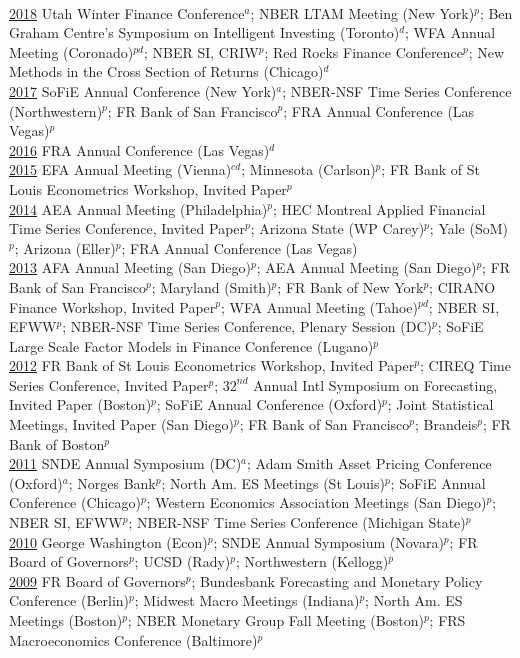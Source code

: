 \documentclass[margin,line,12pt]{res}
\begin{document}
\begin{resume}
\\
\underline{2018} Utah Winter Finance Conference$^a$; NBER LTAM Meeting (New York)$^p$; Ben Graham Centre's Symposium on Intelligent Investing (Toronto)$^d$; WFA Annual Meeting (Coronado)$^{pd}$; NBER SI, CRIW$^p$; Red Rocks Finance Conference$^p$; New Methods in the Cross Section of Returns (Chicago)$^d$\\
\underline{2017} SoFiE Annual Conference (New York)$^a$; NBER-NSF Time Series Conference (Northwestern)$^p$; FR Bank of San Francisco$^p$; FRA Annual Conference (Las Vegas)$^p$\\
\underline{2016} FRA Annual Conference (Las Vegas)$^{d}$\\
\underline{2015} EFA Annual Meeting (Vienna)$^{cd}$; Minnesota (Carlson)$^p$; FR Bank of St Louis Econometrics Workshop, Invited Paper$^p$\\
\underline{2014} AEA Annual Meeting (Philadelphia)$^p$; HEC Montreal Applied Financial Time Series Conference, Invited Paper$^p$; Arizona State (WP Carey)$^p$; Yale (SoM)$^p$; Arizona (Eller)$^p$; FRA Annual Conference (Las Vegas)\\
\underline{2013} AFA Annual Meeting (San Diego)$^p$; AEA Annual Meeting (San Diego)$^p$; FR Bank of San Francisco$^p$; Maryland (Smith)$^p$; FR Bank of New York$^p$; CIRANO Finance Workshop, Invited Paper$^p$; WFA Annual Meeting (Tahoe)$^{pd}$; NBER SI, EFWW$^p$; NBER-NSF Time Series Conference, Plenary Session (DC)$^p$; SoFiE Large Scale Factor Models in Finance Conference (Lugano)$^p$\\
\underline{2012} FR Bank of St Louis Econometrics Workshop, Invited Paper$^p$; CIREQ Time Series Conference, Invited Paper$^p$; $32^{nd}$ Annual Intl Symposium on Forecasting, Invited Paper (Boston)$^p$; SoFiE Annual Conference (Oxford)$^p$; Joint Statistical Meetings, Invited Paper (San Diego)$^p$; FR Bank of San Francisco$^p$; Brandeis$^p$; FR Bank of Boston$^p$\\
\underline{2011} SNDE Annual Symposium (DC)$^a$; Adam Smith Asset Pricing Conference (Oxford)$^a$; Norges Bank$^p$; North Am. ES Meetings (St Louis)$^p$; SoFiE Annual Conference (Chicago)$^p$; Western Economics Association Meetings (San Diego)$^p$; NBER SI, EFWW$^p$; NBER-NSF Time Series Conference (Michigan State)$^p$\\
\underline{2010} George Washington (Econ)$^p$; SNDE Annual Symposium (Novara)$^p$; FR Board of Governors$^p$; UCSD (Rady)$^p$; Northwestern (Kellogg)$^p$\\
\underline{2009} FR Board of Governors$^p$; Bundesbank Forecasting and Monetary Policy Conference (Berlin)$^p$; Midwest Macro Meetings (Indiana)$^p$; North Am. ES Meetings (Boston)$^p$; NBER Monetary Group Fall Meeting (Boston)$^p$; FRS Macroeconomics Conference (Baltimore)$^p$\\

\end{resume}
\end{document}
